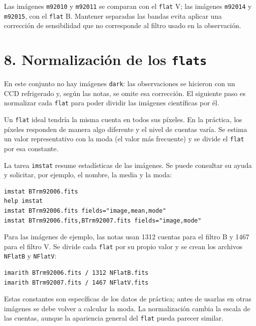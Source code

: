 \documentclass[11pt]{article}
\begin{document}
Las imágenes \texttt{m92010} y \texttt{m92011} se comparan con el
\texttt{flat} V; las imágenes \texttt{m92014} y \texttt{m92015}, con el
\texttt{flat} B. Mantener separadas las bandas evita aplicar una corrección de
sensibilidad que no corresponde al filtro usado en la observación.

\newpage
\section*{8. Normalización de los \texttt{flats}}

En este conjunto no hay imágenes \texttt{dark}: las observaciones se hicieron
con un CCD refrigerado y, según las notas, se omite esa corrección. El siguiente
paso es normalizar cada \texttt{flat} para poder dividir las imágenes
científicas por él.

Un \texttt{flat} ideal tendría la misma cuenta en todos sus píxeles. En la
práctica, los píxeles responden de manera algo diferente y el nivel de cuentas
varía. Se estima un valor representativo con la moda (el valor más frecuente)
y se divide el \texttt{flat} por esa constante.

\begin{center}
  
\end{center}

La tarea \texttt{imstat} resume estadísticas de las imágenes. Se puede
consultar su ayuda y solicitar, por ejemplo, el nombre, la media y la moda:

\begin{verbatim}
imstat BTrm92006.fits
help imstat
imstat BTrm92006.fits fields="image,mean,mode"
imstat BTrm92006.fits,BTrm92007.fits fields="image,mode"
\end{verbatim}

Para las imágenes de ejemplo, las notas usan 1312 cuentas para el filtro B y
1467 para el filtro V. Se divide cada \texttt{flat} por su propio valor y se
crean los archivos \texttt{NFlatB} y \texttt{NFlatV}:

\begin{verbatim}
imarith BTrm92006.fits / 1312 NFlatB.fits
imarith BTrm92007.fits / 1467 NFlatV.fits
\end{verbatim}

Estas constantes son específicas de los datos de práctica; antes de usarlas en
otras imágenes se debe volver a calcular la moda. La normalización cambia la
escala de las cuentas, aunque la apariencia general del \texttt{flat} pueda
parecer similar.
\end{document}
